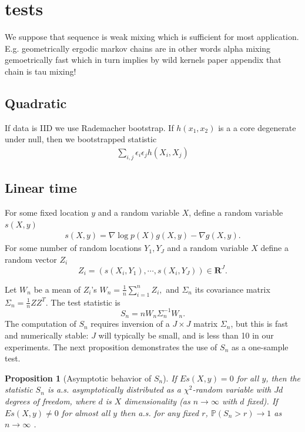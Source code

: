 \documentclass{article}
\newtheorem{proposition}{Proposition}
\begin{document}
\section{tests}
We suppose that sequence is weak mixing which is sufficient for most application. E.g. geometrically ergodic  markov chains are in other words alpha mixing gemoetrically fast which in turn implies by wild kernels paper appendix that chain is tau mixing!  
\subsection{Quadratic}
If data is IID we use Rademacher bootstrap. If $h(x_1,x_2)$ is a a core degenerate under null, then we bootstrapped statistic
\begin{align}
 \sum_{i,j} \epsilon_i \epsilon_j h(X_i,X_j)
\end{align}

\subsection{Linear time}

For some fixed location $y$ and a random variable $X$, define a random variable $s(X,y)$
\begin{align}
 s(X,y) = \nabla \log p(X) g(X,y) -  \nabla g(X,y).
\end{align}
For some number of random locations $Y_1,Y_J$ and a random variable $X$ define a random vector $Z_i$
\begin{equation}
 Z_i = ( s(X_i,Y_1) , \cdots, s(X_i,Y_J)  )\in \mathbf R^J.
\end{equation}

Let $W_n$ be a mean of $Z_i$'s
$W_n = \frac 1  n \sum_{i=1}^n Z_i, $
and $\Sigma_n$ its  covariance matrix
$\Sigma_n = \frac 1  n Z Z^{T}$.
The test statistic is
\begin{equation}
 S_n = n W_n \Sigma_n^{-1} W_n.
\end{equation}
The computation of $S_n$ requires inversion of a $J\times J$ matrix $\Sigma_n$, but this is fast and numerically stable: $J$ will typically be small, and is less than 10 in our experiments. The next proposition demonstrates the use of $S_n$ as a one-sample test.
\begin{proposition}[Asymptotic behavior of $S_n$]
\label{prop:Hotelling}
 If  $E s(X,y)=0$ for all $y$, then the statistic $S_n$ is a.s. asymptotically distributed as a $\chi^2$-random variable with $Jd$ degrees of freedom, where $d$ is $X$ dimensionality (as $n \to \infty$ with $d$ fixed). If  $E s(X,y) \neq 0$ for almost all $y$ then a.s. for any fixed $r$, $\mathbb P(S_n > r) \to 1$  as $n \to \infty$ .
\end{proposition}
\end{document}
